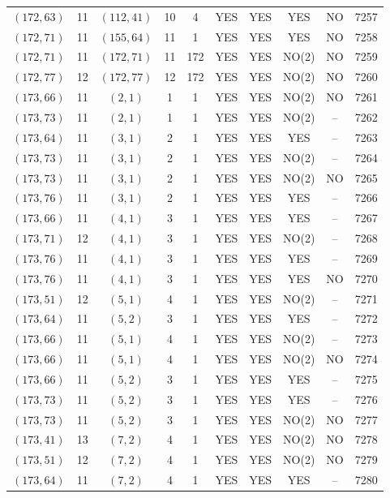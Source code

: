 \begin{longtable}{|c|c|c|c|c|c|c|c|c|c|}
$(172, 63)$ & 11 & $(112, 41)$ & 10 & 4 & YES & YES & YES & NO & 7257\\
$(172, 71)$ & 11 & $(155, 64)$ & 11 & 1 & YES & YES & YES & NO & 7258\\
$(172, 71)$ & 11 & $(172, 71)$ & 11 & 172 & YES & YES & NO(2) & NO & 7259\\
$(172, 77)$ & 12 & $(172, 77)$ & 12 & 172 & YES & YES & NO(2) & NO & 7260\\
$(173, 66)$ & 11 & $(2, 1)$ & 1 & 1 & YES & YES & NO(2) & NO & 7261\\
$(173, 73)$ & 11 & $(2, 1)$ & 1 & 1 & YES & YES & NO(2) & -- & 7262\\
$(173, 64)$ & 11 & $(3, 1)$ & 2 & 1 & YES & YES & YES & -- & 7263\\
$(173, 73)$ & 11 & $(3, 1)$ & 2 & 1 & YES & YES & NO(2) & -- & 7264\\
$(173, 73)$ & 11 & $(3, 1)$ & 2 & 1 & YES & YES & NO(2) & NO & 7265\\
$(173, 76)$ & 11 & $(3, 1)$ & 2 & 1 & YES & YES & YES & -- & 7266\\
$(173, 66)$ & 11 & $(4, 1)$ & 3 & 1 & YES & YES & YES & -- & 7267\\
$(173, 71)$ & 12 & $(4, 1)$ & 3 & 1 & YES & YES & NO(2) & -- & 7268\\
$(173, 76)$ & 11 & $(4, 1)$ & 3 & 1 & YES & YES & YES & -- & 7269\\
$(173, 76)$ & 11 & $(4, 1)$ & 3 & 1 & YES & YES & YES & NO & 7270\\
$(173, 51)$ & 12 & $(5, 1)$ & 4 & 1 & YES & YES & NO(2) & -- & 7271\\
$(173, 64)$ & 11 & $(5, 2)$ & 3 & 1 & YES & YES & YES & -- & 7272\\
$(173, 66)$ & 11 & $(5, 1)$ & 4 & 1 & YES & YES & NO(2) & -- & 7273\\
$(173, 66)$ & 11 & $(5, 1)$ & 4 & 1 & YES & YES & NO(2) & NO & 7274\\
$(173, 66)$ & 11 & $(5, 2)$ & 3 & 1 & YES & YES & YES & -- & 7275\\
$(173, 73)$ & 11 & $(5, 2)$ & 3 & 1 & YES & YES & YES & -- & 7276\\
$(173, 73)$ & 11 & $(5, 2)$ & 3 & 1 & YES & YES & NO(2) & NO & 7277\\
$(173, 41)$ & 13 & $(7, 2)$ & 4 & 1 & YES & YES & NO(2) & NO & 7278\\
$(173, 51)$ & 12 & $(7, 2)$ & 4 & 1 & YES & YES & NO(2) & NO & 7279\\
$(173, 64)$ & 11 & $(7, 2)$ & 4 & 1 & YES & YES & YES & -- & 7280\\

\end{longtable}
